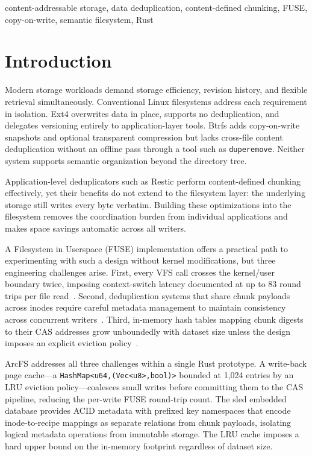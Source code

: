 \documentclass[conference]{IEEEtran}
\begin{document}
\begin{IEEEkeywords}
content-addressable storage, data deduplication, content-defined chunking,
FUSE, copy-on-write, semantic filesystem, Rust
\end{IEEEkeywords}

\section{Introduction}

Modern storage workloads demand storage efficiency, revision history,
and flexible retrieval simultaneously. Conventional Linux filesystems
address each requirement in isolation. Ext4 overwrites data in place,
supports no deduplication, and delegates versioning entirely to application-layer
tools. Btrfs adds copy-on-write snapshots and optional transparent compression
but lacks cross-file content deduplication without an offline pass through a
tool such as \texttt{duperemove}. Neither system supports semantic organization
beyond the directory tree.

Application-level deduplicators such as Restic perform
content-defined chunking effectively, yet their benefits do not extend to
the filesystem layer: the underlying storage still writes every byte verbatim.
Building these optimizations into the filesystem removes the coordination
burden from individual applications and makes space savings automatic across
all writers.

A Filesystem in Userspace (FUSE) implementation offers a practical path to
experimenting with such a design without kernel modifications, but three
engineering challenges arise. First, every VFS call crosses the kernel/user
boundary twice, imposing context-switch latency documented at up to
83 round trips per file read~\cite{vangoor2017fuse}. Second, deduplication
systems that share chunk payloads across inodes require careful metadata
management to maintain consistency across concurrent writers~\cite{soules2003metadata}.
Third, in-memory hash tables mapping chunk digests to their CAS addresses
grow unboundedly with dataset size unless the design imposes an explicit
eviction policy~\cite{zhu2008dedup}.

ArcFS addresses all three challenges within a single Rust prototype.
A write-back page cache—a
\texttt{HashMap\textless{}u64,\;(Vec\textless{}u8\textgreater{},\;bool)\textgreater{}}
bounded at 1{,}024 entries by an LRU eviction policy—coalesces small
writes before committing them to the CAS pipeline, reducing
the per-write FUSE round-trip count. The sled embedded database provides
ACID metadata with prefixed key namespaces that encode inode-to-recipe
mappings as separate relations from chunk payloads, isolating logical
metadata operations from immutable storage. The LRU cache imposes a hard
upper bound on the in-memory footprint regardless of dataset size.
\end{document}
